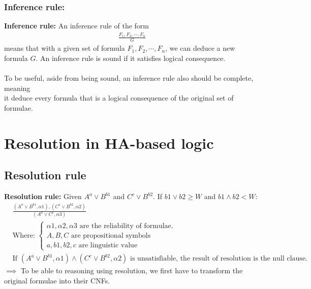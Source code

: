 \documentclass[26pt,fleqn,]{article}
\begin{document}
\subsubsection{Inference rule:}
{\bfseries Inference rule:} An inference rule of the form\\
\begin{align*}
	\frac{F_1, F_2,\cdots,F_n}{G}
\end{align*}
means that with a given set of formula \(F_1,F_2,\cdots,F_n\), we can deduce a 
new formula \(G\). An inference rule is sound if it satisfies logical consequence.\\\\
To be useful, aside from being sound, an inference rule also should be complete, meaning\\
it deduce every formula that is a logical consequence of the original set of formulae.\\

%
%
\section{Resolution in HA-based logic}
\subsection{Resolution rule}
{\bfseries Resolution rule:} Given \(A^a \vee B^{b1}\) and \(C^c \vee B^{b2}\). If \(b1 \vee b2 
\ge W\) and \(b1 \wedge b2 < W\):
\begin{align*}
	&\frac{(A^a \vee B^{b1}, {\alpha 1}), (C^c \vee B^{b2}, {\alpha 2})} {(A^a \vee C^c, {\alpha 3})}\\
	&\text{Where: }
	\begin{cases}
	\alpha 1, \alpha 2, \alpha 3 \text{ are the reliability of formulae.}\\
	A, B, C \text{ are propositional symbols}\\
	a, b1, b2, c \text{ are linguistic value}
	\end{cases}
	\\
	&\text{If } (A^a \vee B^{b1}, {\alpha 1}) \wedge (C^c \vee B^{b2}, {\alpha 2}) \text{ is 
	unsatisfiable, the result of resolution is the null clause.} 
\end{align*}
\(\implies\) To be able to reasoning using resolution, we first have to transform the original
formulae into their CNFs.\\
\end{document}
